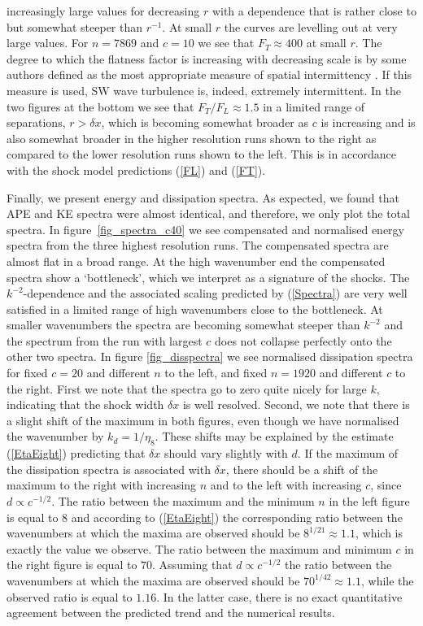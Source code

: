 increasingly large values for decreasing $ r $ with a dependence that is rather
close to but somewhat steeper than $ r^{-1} $. At small $ r $ the curves are
levelling out at very large values. For $ n = 7869 $ and $ c = 10 $ we see that
$ F_{T} \approx 400 $ at small $ r $. The degree to which the flatness factor
is increasing with decreasing scale is by some authors defined as the most
appropriate measure of spatial intermittency \citep[see for example][]{Frisch}.
If this measure is used, SW wave turbulence is, indeed, extremely intermittent.
In the two figures at the bottom we see that $ F_{T}/F_{L} \approx 1.5 $ in a
limited range of separations, $ r > \delta x $, which is becoming somewhat
broader as $ c $ is increasing and is also somewhat broader in the higher
resolution runs shown to the right as compared to the lower resolution runs
shown to the left. This is in accordance with the shock model predictions
(\ref{FL}) and (\ref{FT}).

Finally, we present energy and dissipation spectra. As expected, we found that APE and KE
spectra were almost identical, and therefore, we only plot the
total spectra. In figure~\ref{fig_spectra_c40} we see  compensated and
normalised energy spectra from the three highest resolution runs. The
compensated spectra are almost flat in a broad range. At the high wavenumber
end the compensated spectra show a `bottleneck', which we interpret as a
signature of the shocks. The $ k^{-2} $-dependence and the associated scaling predicted
by (\ref{Spectra}) are very well satisfied in a limited range of high wavenumbers close to the bottleneck. At smaller wavenumbers the spectra are
becoming somewhat steeper than $ k^{-2} $ and the spectrum from the run with
largest $ c $ does not collapse perfectly onto the other two spectra.  In figure \ref{fig_disspectra}
 we see normalised dissipation spectra for fixed $ c= 20 $ and different $ n $ to the left, and fixed $ n = 1920 $
and different $ c $ to the right. First we note that the spectra go to zero quite nicely for large $ k $, indicating that the shock width $ \delta x $ is well resolved. Second, we note that there is a slight shift of the maximum in both figures, even though we have normalised the wavenumber by $ k_d = 1/\eta_8 $.   These shifts may be explained by the estimate (\ref{EtaEight}) predicting that $ \delta x $ should vary slightly with $ d $. If the maximum of the dissipation spectra is associated with $ \delta x $, there should be a shift of the maximum  to the right with increasing $ n $ and to the left with increasing $ c $, since $ d \propto c^{-1/2} $.
 The ratio between the maximum and the minimum $ n $ in the left figure is equal to 8 and  according to (\ref{EtaEight}) the corresponding ratio between the wavenumbers at which the maxima are observed should be $ 8^{1/21} \approx 1.1 $, which is exactly the value we observe. The ratio between the maximum and minimum $ c $ in the right figure is equal to $ 70 $. Assuming that $ d \propto c^{-1/2} $ the ratio between the wavenumbers at which the maxima are observed should be $ 70^{1/42} \approx 1.1 $, while the observed ratio is equal to $ 1.16 $. In the latter case, there is no exact quantitative agreement between the predicted trend and the numerical results.




